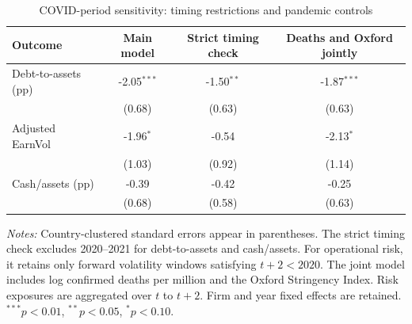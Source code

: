 \begin{table}[H]
    \caption{COVID-period sensitivity: timing restrictions and pandemic controls}
    \label{tab:robustness_covid}
    \centering
    \small
    \begin{tabular}{lccc}
        \toprule
        Outcome & Main model & Strict timing check & Deaths and Oxford jointly \\
        \midrule
        Debt-to-assets (pp) & -2.05\(^{***}\) & -1.50\(^{**}\) & -1.87\(^{***}\) \\
                            & (0.68) & (0.63) & (0.63) \\
        Adjusted EarnVol & -1.96\(^{*}\) & -0.54 & -2.13\(^{*}\) \\
                         & (1.03) & (0.92) & (1.14) \\
        Cash/assets (pp) & -0.39 & -0.42 & -0.25 \\
                         & (0.68) & (0.58) & (0.63) \\
        \bottomrule
    \end{tabular}
    \parbox{\textwidth}{\vspace{0.35em}\footnotesize\textit{Notes:} Country-clustered standard errors appear in parentheses. The strict timing check excludes 2020--2021 for debt-to-assets and cash/assets. For operational risk, it retains only forward volatility windows satisfying \(t+2<2020\). The joint model includes log confirmed deaths per million and the Oxford Stringency Index. Risk exposures are aggregated over \(t\) to \(t+2\). Firm and year fixed effects are retained. \(^{***}p<0.01\), \(^{**}p<0.05\), \(^{*}p<0.10\).}
\end{table}

